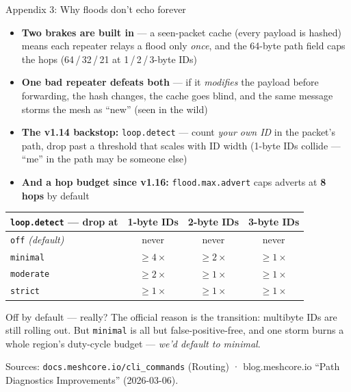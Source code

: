 \documentclass[aspectratio=\baAspect,t,9pt]{beamer}
\begin{document}
\begin{frame}[noframenumbering]{Appendix 3: Why floods don't echo forever}
  \small
  \begin{itemize}
    \item \textbf{Two brakes are built in} --- a seen-packet cache (every
      payload is hashed) means each repeater relays a flood only \emph{once},
      and the 64-byte path field caps the hops (64\,/\,32\,/\,21 at
      1\,/\,2\,/\,3-byte IDs)
    \item \textbf{One bad repeater defeats both} --- if it \emph{modifies} the
      payload before forwarding, the hash changes, the cache goes blind, and
      the same message storms the mesh as ``new'' (seen in the wild)
    \item \textbf{The v1.14 backstop:} \texttt{loop.detect} --- count
      \emph{your own ID} in the packet's path, drop past a threshold that
      scales with ID width (1-byte IDs collide --- ``me'' in the path may be
      someone else)
    \item \textbf{And a hop budget since v1.16:} \texttt{flood.max.advert}
      caps adverts at \textbf{8 hops} by default
  \end{itemize}
  \vfill
  \centering
  \renewcommand{\arraystretch}{0.92}%
  \begin{tabular}{lccc}
    \toprule
    \texttt{loop.detect} --- drop at & 1-byte IDs & 2-byte IDs & 3-byte IDs \\
    \midrule
    \texttt{off} \emph{(default)} & never & never & never \\
    \texttt{minimal}  & $\geq4\times$ & $\geq2\times$ & $\geq1\times$ \\
    \texttt{moderate} & $\geq2\times$ & $\geq1\times$ & $\geq1\times$ \\
    \texttt{strict}   & $\geq1\times$ & $\geq1\times$ & $\geq1\times$ \\
    \bottomrule
  \end{tabular}
  \vfill
  \begin{alertblock}{Off by default --- really?}
    The official reason is the transition: multibyte IDs are still rolling
    out. But \texttt{minimal} is all but false-positive-free, and one storm
    burns a whole region's duty-cycle budget --- \emph{we'd default to
    minimal}.
  \end{alertblock}
  {\footnotesize Sources: \texttt{docs.meshcore.io/cli\_commands} (Routing) ·
   blog.meshcore.io ``Path Diagnostics Improvements'' (2026-03-06).}
\end{frame}
\end{document}
